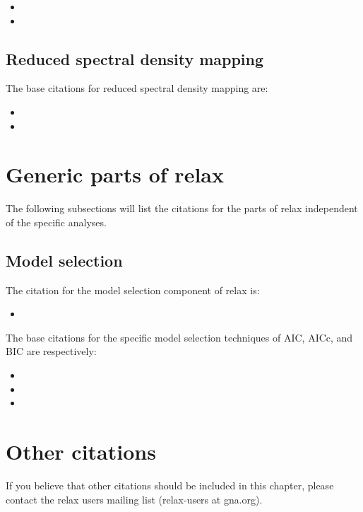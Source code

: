 \begin{itemize}
\item {}
\item {}
\end{itemize}



\subsection{Reduced spectral density mapping}

The base citations for reduced spectral density mapping are:

\begin{itemize}
\item {}
\item {}
\end{itemize}




\section{Generic parts of relax}

The following subsections will list the citations for the parts of relax independent of the specific analyses.



\subsection{Model selection}

The citation for the model selection component of relax is:

\begin{itemize}
\item {}
\end{itemize}

The base citations for the specific model selection techniques of AIC, AICc, and BIC are respectively:

\begin{itemize}
\item {}
\item {}
\item {}
\end{itemize}




\section{Other citations}

If you believe that other citations should be included in this chapter, please contact the relax users mailing list (relax-users at gna.org).

